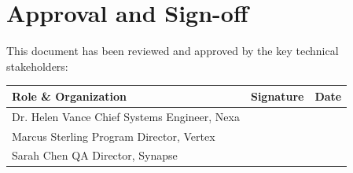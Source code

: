 \section{Approval and Sign-off}
This document has been reviewed and approved by the key technical stakeholders:

\vspace{0.4cm}
\noindent
\begin{tabularx}{\textwidth}{X X l}
\toprule
\textbf{Role \& Organization} & \textbf{Signature} & \textbf{Date} \\
\midrule
Dr. Helen Vance \newline Chief Systems Engineer, Nexa & & \\
\midrule
Marcus Sterling \newline Program Director, Vertex & & \\
\midrule
Sarah Chen \newline QA Director, Synapse & & \\
\bottomrule
\end{tabularx}

